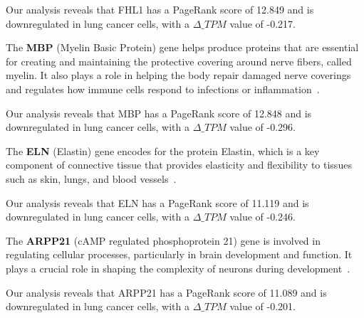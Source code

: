 Our analysis reveals that FHL1 has a PageRank score of 12.849 and is downregulated in lung cancer cells,
with a $\Delta\_TPM$ value of -0.217.
\newline

The \textbf{MBP} (Myelin Basic Protein) gene helps produce proteins that are essential for creating and maintaining the protective covering around nerve fibers,
called myelin.
It also plays a role in helping the body repair damaged nerve coverings and
regulates how immune cells respond to infections or inflammation~\cite{Nye1995MBP}.

Our analysis reveals that MBP has a PageRank score of 12.848 and is downregulated in lung cancer cells,
with a $\Delta\_TPM$ value of -0.296.
\newline

The \textbf{ELN} (Elastin) gene encodes for the protein Elastin, which is a key component of connective tissue that provides elasticity and
flexibility to tissues such as skin, lungs, and blood vessels~\cite{Debelle1999ELN}.

Our analysis reveals that ELN has a PageRank score of 11.119 and is downregulated in lung cancer cells,
with a $\Delta\_TPM$ value of -0.246.
\newline

The \textbf{ARPP21} (cAMP regulated phosphoprotein 21) gene is involved in regulating cellular processes, particularly in brain development and function.
It plays a crucial role in shaping the complexity of neurons during development~\cite{Rehfeld2018ARPP21}.

Our analysis reveals that ARPP21 has a PageRank score of 11.089 and is downregulated in lung cancer cells,
with a $\Delta\_TPM$ value of -0.201.
\newline